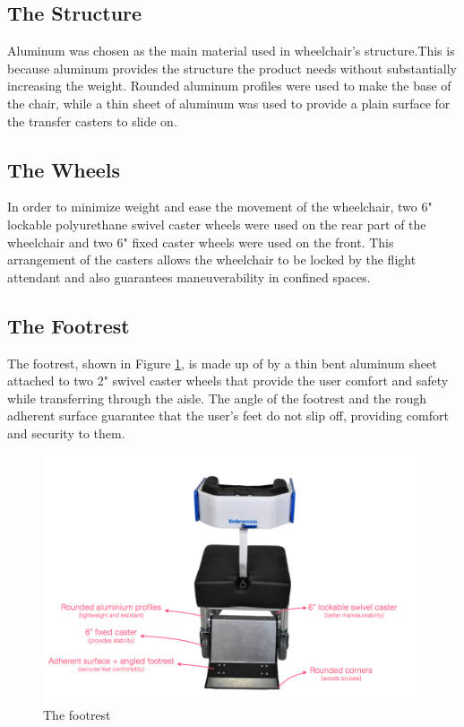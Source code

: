\subsection{The Structure}
Aluminum was chosen as the main material used in wheelchair’s  structure.This is because aluminum provides the structure the product needs without substantially increasing the weight. Rounded aluminum profiles were used to make the base of the chair, while a thin sheet of aluminum was used to provide a plain surface for the transfer casters to slide on.



\subsection{The Wheels}
In order to minimize weight and ease the movement of the wheelchair, two 6" lockable polyurethane swivel caster wheels were used on the rear part of the wheelchair and two 6" fixed caster wheels were used on the front. This arrangement of the casters allows the wheelchair to be locked by the flight attendant and also guarantees maneuverability in confined spaces.




\subsection{The Footrest}

The footrest, shown in Figure \ref{fig:footrest},  is made up of by a thin bent aluminum sheet attached to two 2" swivel caster wheels that provide the user comfort and safety while transferring through the aisle. The angle of the footrest and the rough adherent surface guarantee that the user's feet do not slip off, providing comfort and security to them.
 

\begin{figure}[h]
\centering
\includegraphics[width=13cm]{images/AisleWheelchair2.png}
\caption{The footrest}
\label{fig:footrest}
\end{figure}

